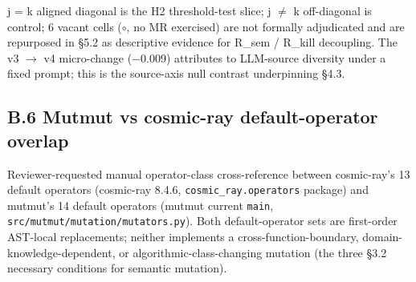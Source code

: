 \documentclass[acmsmall,screen,review]{acmart}
\begin{document}
j = k aligned diagonal is the H2 threshold-test slice; j $\neq$ k
off-diagonal is control; 6 vacant cells ($\circ$, no MR exercised) are not formally
adjudicated and are repurposed in §5.2 as descriptive evidence for
R\_sem / R\_kill decoupling. The v3 $\to$ v4 micro-change (−0.009)
attributes to LLM-source diversity under a fixed prompt; this is the
source-axis null contrast underpinning §4.3.

\subsection{B.6 Mutmut vs cosmic-ray default-operator overlap}\label{b.6-mutmut-vs-cosmic-ray-default-operator-overlap}

Reviewer-requested manual operator-class cross-reference between
cosmic-ray's 13 default operators (cosmic-ray 8.4.6,
\texttt{cosmic\_ray.operators} package) and mutmut's 14 default
operators (mutmut current \texttt{main},
\texttt{src/mutmut/mutation/mutators.py}). Both default-operator sets
are first-order AST-local replacements; neither implements a
cross-function-boundary, domain-knowledge-dependent, or
algorithmic-class-changing mutation (the three §3.2 necessary conditions
for semantic mutation).
\end{document}
